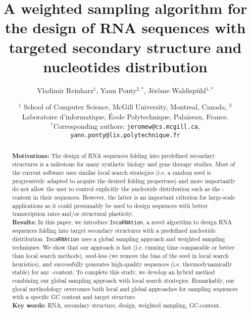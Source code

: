 \documentclass[11pt]{article}
\title{A weighted sampling algorithm for the design of RNA sequences with targeted secondary structure and nucleotides distribution}
\author{Vladimir Reinharz$^1$, Yann Ponty$^{2,*}$, J\'er\^{o}me Waldisp\"{u}hl$^{1,*}$}
\date{$^1$ School of Computer Science, McGill University, Montreal, Canada, $^2$ Laboratoire d'informatique, \'Ecole Polytechnique, Palaiseau, France.\\ \small $^*$Corresponding authors: \texttt{jeromew@cs.mcgill.ca}, \texttt{yann.ponty@lix.polytechnique.fr}}
\newcommand{\ourprog}{\texttt{IncaRNAtion}\xspace}
\newcommand{\GCContent}{\Gb\Cb-content\xspace}
\begin{document}
\maketitle
\begin{abstract}
\noindent
\textbf{Motivations:} The design of RNA sequences folding into predefined secondary structures is a milestone for many synthetic biology and gene therapy studies. Most of the current software uses similar local search strategies (i.e. a random seed is progressively adapted to acquire the desired folding propertues) and more importantly do not allow the user to control explicitly the nucleotide distribution such as the \GCContent in their sequences. However, the latter is an important criterion for large-scale applications as it could presumably be used to design sequences with better transcription rates and/or structural plasticity.\\
\noindent
\textbf{Results:}
In this paper, we introduce \ourprog, a novel algorithm to design RNA sequences folding into target secondary structures with a predefined nucleotide distribution.  \ourprog uses a global sampling approach and weighted sampling techniques. We show that our approach is fast (i.e. running time comparable or better than local search methods), seed-less (we remove the bias of the seed in local search heuristics), and successfully generates high-quality sequences (i.e. thermodynamically stable) for any \GCContent. To complete this study, we develop an hybrid method combining our global sampling approach with local search strategies. Remarkably, our glocal methodology overcomes both local and global approaches  for sampling sequences with a specific GC content and target structure.\\
\noindent
\textbf{Key words:} RNA, secondary structure, design, weighted sampling, GC-content.
\end{abstract}

\newpage











\newpage




\newpage


\end{document}
